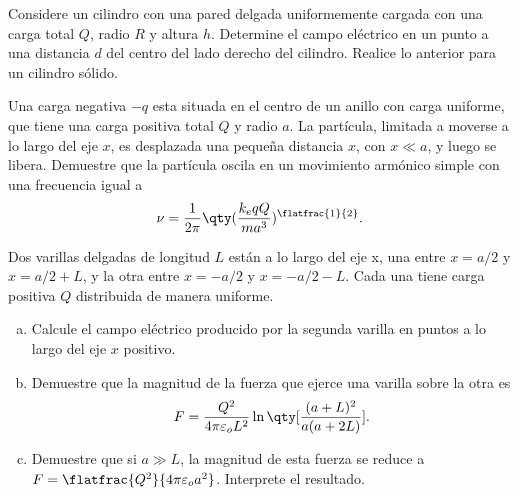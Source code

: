 \begin{mdframed}[style=warning]
	\begin{ejercicio}
		Considere un cilindro con una pared delgada uniformemente cargada con una carga total $Q$, radio $R$ y altura $h$. Determine el campo eléctrico en un punto a una distancia $d$ del centro del lado derecho del cilindro. Realice lo anterior para un cilindro sólido.
	\end{ejercicio}
\end{mdframed}






\begin{mdframed}[style=warning]
	\begin{ejercicio}
		Una carga negativa $-q$ esta situada en el centro de un anillo con carga uniforme, que tiene una carga positiva total $Q$ y radio $a$. La partícula, limitada a moverse a lo largo del eje $x$, es desplazada una pequeña distancia $x$, con $x\ll a$, y luego se libera. Demuestre que la partícula oscila en un movimiento armónico simple con una frecuencia igual a
		$$ \nu = \frac{1}{2\pi} \qty(\frac{k_e qQ}{ma^3}) ^{\flatfrac{1}{2}} .$$
	\end{ejercicio}
\end{mdframed}






\begin{mdframed}[style=warning]
	\begin{ejercicio}
		Dos varillas delgadas de longitud $L$ están a lo largo del eje x, una entre $x = a/2$ y $x = a/2 + L$, y la otra entre $x = -a/2$ y $x = -a/2 - L$. Cada una tiene carga positiva $Q$ distribuida de manera uniforme.
		\begin{enumerate}[a)]
			\item Calcule el campo eléctrico producido por la segunda varilla en puntos a lo largo del eje $x$ positivo.
			\item Demuestre que la magnitud de la fuerza que ejerce una varilla sobre la otra es
				$$ F = \frac{Q^2}{4\pi \varepsilon _o L^2} \ln{\qty[\frac{(a + L)^2}{a(a + 2L)}]}. $$
			\item Demuestre que si $a \gg L$, la magnitud de esta fuerza se reduce a $F = \flatfrac{Q^2}{4\pi \varepsilon _o a^2}$. Interprete el resultado.
		\end{enumerate}
	\end{ejercicio}
\end{mdframed}



































